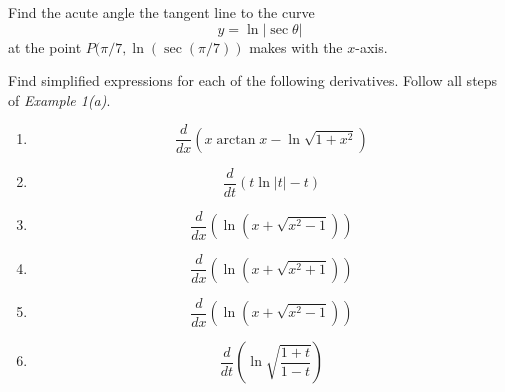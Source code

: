 \documentclass{ximera}
\begin{document}
\begin{exercise}  \label{EX:JDHFeMERE34}
Find the acute angle the tangent line to the curve
\[
      y = \ln \left|  \sec\theta \right|
\]
at the point $P(\pi/7, \ln (\sec(\pi/7))$ makes with the $x$-axis. 
\end{exercise}

\begin{exercise} \label{EX:Her4r3erf}
Find simplified expressions for each of the following derivatives. Follow all steps of \emph{Example 1(a)}.

\begin{enumerate}
\item 
\[
      \frac{d}{dx}\left(  x \arctan x - \ln \sqrt{1+x^2} \right)
\]

\item 
\[
  \frac{d}{dt}\left(  t \ln |t| - t \right)
\]

\item 
\[
\frac{d}{dx} \left(    \ln (x + \sqrt{x^2-1})   \right)
\]

\item 
\[
\frac{d}{dx} \left(    \ln (x + \sqrt{x^2+1})   \right)
\]

\item 
\[
\frac{d}{dx} \left(    \ln (x + \sqrt{x^2-1})   \right)
\]

\item 
\[
\frac{d}{dt} \left(    \ln \sqrt{\frac{1+t}{1-t}}   \right)
\]


\end{enumerate}

\end{exercise}
\end{document}
